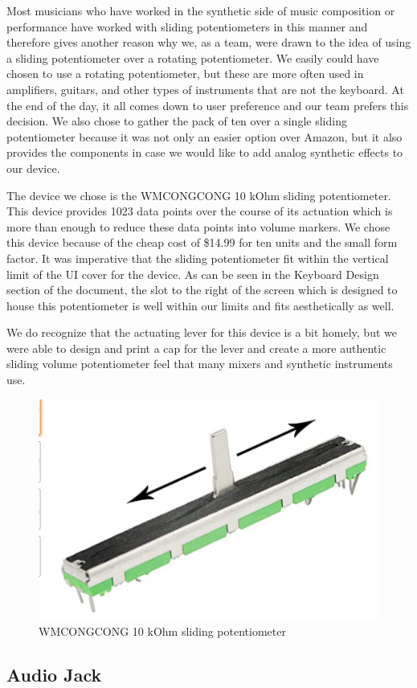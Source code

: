 Most musicians who have worked in the synthetic side of music composition or performance have worked with sliding potentiometers in this manner and therefore gives another reason why we, as a team, were drawn to the idea of using a sliding potentiometer over a rotating potentiometer. We easily could have chosen to use a rotating potentiometer, but these are more often used in amplifiers, guitars, and other types of instruments that are not the keyboard. At the end of the day, it all comes down to user preference and our team prefers this decision. We also chose to gather the pack of ten over a single sliding potentiometer because it was not only an easier option over Amazon, but it also provides the components in case we would like to add analog synthetic effects to our device.

The device we chose is the WMCONGCONG 10 kOhm sliding potentiometer. This device provides 1023 data points over the course of its actuation which is more than enough to reduce these data points into volume markers. We chose this device because of the cheap cost of \$14.99 for ten units and the small form factor. It was imperative that the sliding potentiometer fit within the vertical limit of the UI cover for the device. As can be seen in the Keyboard Design section of the document, the slot to the right of the screen which is designed to house this potentiometer is well within our limits and fits aesthetically as well.

We do recognize that the actuating lever for this device is a bit homely, but we were able to design and print a cap for the lever and create a more authentic sliding volume potentiometer feel that many mixers and synthetic instruments use.

\begin{figure}[h!]
  \centering
  \includegraphics[width=0.5\linewidth]{image/Potentiometer.png}
  \caption{WMCONGCONG 10 kOhm sliding potentiometer}
  \label{fig:potentiometer}
\end{figure}


\subsection{Audio Jack}

